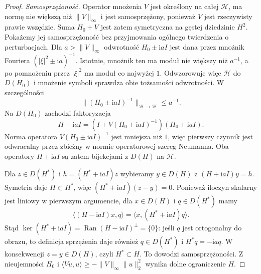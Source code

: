 \begin{proof}
\emph{Samosprzężoność.}
Operator mnożenia $V$ jest określony na całej
$\mathcal H$, ma normę nie większą niż $\|V\|_\infty$
i jest samosprzężony, ponieważ $V$ jest rzeczywisty
prawie wszędzie. Suma $H_0+V$ jest zatem symetryczna
na gęstej dziedzinie $H^2$.
Pokażemy jej samosprzężoność bez przyjmowania
ogólnego twierdzenia o perturbacjach.
Dla $a>\|V\|_\infty$ odwrotność $H_0\pm\mathrm iaI$
jest dana przez mnożnik Fouriera
$(|\xi|^2\pm\mathrm ia)^{-1}$. Istotnie, mnożnik
ten ma moduł nie większy niż $a^{-1}$,
a po pomnożeniu przez $|\xi|^2$ ma moduł co
najwyżej $1$. Odwzorowuje więc $\mathcal H$ do
$D(H_0)$ i mnożenie symboli sprawdza obie
tożsamości odwrotności. W szczególności
\[
 \|(H_0\pm\mathrm iaI)^{-1}\|_{\mathcal H\to\mathcal H}
 \le a^{-1}.
\]
Na $D(H_0)$ zachodzi faktoryzacja
\[
 H\pm\mathrm iaI=
 (I+V(H_0\pm\mathrm iaI)^{-1})(H_0\pm\mathrm iaI).
\]
Norma operatora $V(H_0\pm\mathrm iaI)^{-1}$ jest
mniejsza niż $1$, więc pierwszy czynnik jest
odwracalny przez zbieżny w normie operatorowej
szereg Neumanna. Oba operatory $H\pm\mathrm iaI$
są zatem bijekcjami z $D(H)$ na $\mathcal H$.

Dla $z\in D(H^*)$ i $h=(H^*+\mathrm iaI)z$
wybieramy $y\in D(H)$ z $(H+\mathrm iaI)y=h$.
Symetria daje $H\subset H^*$, więc
$(H^*+\mathrm iaI)(z-y)=0$. Ponieważ iloczyn
skalarny jest liniowy w pierwszym argumencie,
dla $x\in D(H)$ i $q\in D(H^*)$ mamy
\[
 \langle(H-\mathrm iaI)x,q\rangle
 =\langle x,(H^*+\mathrm iaI)q\rangle .
\]
Stąd $\ker(H^*+\mathrm iaI)=
\operatorname{Ran}(H-\mathrm iaI)^\perp=\{0\}$:
jeśli $q$ jest ortogonalny do obrazu, to definicja
sprzężenia daje również $q\in D(H^*)$ i
$H^*q=-\mathrm iaq$. W konsekwencji $z=y\in D(H)$,
czyli $H^*\subset H$. To dowodzi samosprzężoności.
Z nieujemności $H_0$ i
$\langle Vu,u\rangle\ge-\|V\|_\infty\|u\|_2^2$
wynika dolne ograniczenie $H$.


\end{proof}

